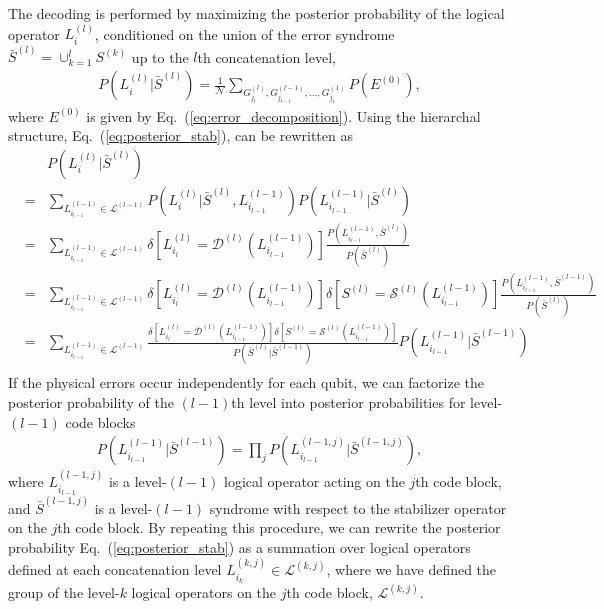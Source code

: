 The decoding is performed by maximizing the posterior probability of the logical operator $L_i^{(l)}$, conditioned on the union of the error syndrome 
$\bar S^{(l)} = \cup_{k=1}^{l} S^{(k)}$ up to the $l$th concatenation level,
\begin{eqnarray}
P(L_i^{(l)}|\bar S^{(l)}) =\frac{1}{\mathcal{N}} \sum _{G_{j_l}^{(l)},G_{j_{l-1}}^{(l-1)},...,G_{j_{1}}^{(1)}} P(E^{(0)}) ,
\label{eq:posterior_stab} 
\end{eqnarray}
where $E^{(0)}$ is given by Eq.\ (\ref{eq:error_decomposition}).
Using the hierarchal structure, Eq.\ (\ref{eq:posterior_stab}), can be rewritten as
\begin{eqnarray}
&&P(L_i^{(l)}|\bar S^{(l)})
\\
&=&\sum _{L_{i_{l-1}}^{(l-1)} \in \mathcal{L}^{(l-1)}}  P(L_i^{(l)}|\bar S^{(l)},L_{i_{l-1}}^{(l-1)}) P(L_{i_{l-1}}^{(l-1)}|\bar S^{(l)})
\nonumber \\
&=&
\sum _{L_{i_{l-1}}^{(l-1)}\in \mathcal{L}^{(l-1)}} \delta \left[  L_{i_{l}}^{(l)} = \mathcal{D}^{(l)}(L_{i_{l-1}}^{(l-1)}) \right] 
\frac{P(L_{i_{l-1}}^{(l-1)},\bar S^{(l)})}{P(\bar S^{(l)})}
\nonumber \\
&=&
\sum _{L_{i_{l-1}}^{(l-1)}\in \mathcal{L}^{(l-1)}}  \delta [  L_{i_{l}}^{(l)} = \mathcal{D}^{(l)}(L_{i_{l-1}}^{(l-1)}) ] 
\delta [  S^{(l)} = \mathcal{S}^{(l)}(L_{i_{l-1}}^{(l-1)}) ] 
\frac{P(L_{i_{l-1}}^{(l-1)},\bar S^{(l-1)})}{P(\bar S^{(l)})}
\nonumber \\
&=&
\sum _{L_{i_{l-1}}^{(l-1)}\in \mathcal{L}^{(l-1)}}  \frac{\delta [  L_{i_{l}}^{(l)} = \mathcal{D}^{(l)}(L_{i_{l-1}}^{(l-1)}) ] \delta [S^{(l)}= \mathcal{S}^{(l)}(L_{i_{l-1}}^{(l-1)}) ]} {P(\bar S^{(l)}|\bar S^{(l-1)})} P(L_{i_{l-1}}^{(l-1)}| \bar S^{(l-1)})
 \nonumber \\
\end{eqnarray}
If the physical errors occur independently for each qubit, we can factorize the posterior probability of the $(l-1)$th level into posterior probabilities for level-$(l-1)$ code blocks
\begin{eqnarray}
 P(L_{i_{l-1}}^{(l-1)}| \bar S^{(l-1)}) = \prod _{j} P(L_{i_{l-1}}^{(l-1,j)}| \bar S^{(l-1,j)}),
\end{eqnarray} 
where $L_{i_{l-1}}^{(l-1,j)}$ is a level-$(l-1)$ logical operator acting on the $j$th code block, and $\bar S^{(l-1,j)}$ is a level-$(l-1)$ syndrome with respect to the stabilizer operator on the $j$th code block.
By repeating this procedure, we can rewrite the posterior probability Eq.\ (\ref{eq:posterior_stab}) as a summation over logical operators defined at each concatenation level $L_{i_{k}}^{(k,j)} \in \mathcal{L}^{(k,j)}$, where we have defined the group of the level-$k$ logical operators on the $j$th code block, $\mathcal{L}^{(k,j)}$.

